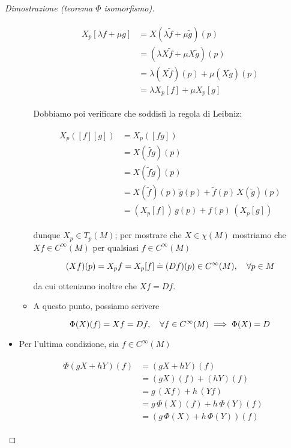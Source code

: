 \begin{proof}[Dimostrazione (teorema $ \Phi $ isomorfismo)]
\begin{itemize}
\begin{itemize}
		\begin{align}
			\begin{split}
				X_{p} [\lambda f + \mu g] &= X (\lambda \tilde{f} + \mu \tilde{g})(p)\\
				&= (\lambda X \tilde{f} + \mu X \tilde{g})(p)\\
				&= \lambda (X \tilde{f})(p) + \mu (X \tilde{g})(p)\\
				&= \lambda X_{p} [f] + \mu X_{p} [g]
			\end{split}
		\end{align}
	
		Dobbiamo poi verificare che soddisfi la regola di Leibniz:
		
		\begin{align}
			\begin{split}
				X_{p} ([f] [g]) &= X_{p} ([f g])\\
				&= X (\tilde{f g})(p)\\
				&= X (\tilde{f} \tilde{g})(p)\\
				&= X (\tilde{f})(p) \, \tilde{g}(p) + \tilde{f}(p) \, X (\tilde{g})(p)\\
				&= (X_{p} [f]) \, g(p) + f(p) \, (X_{p} [g])
			\end{split}
		\end{align}
	
		dunque $ X_{p} \in T_{p}(M) $; per mostrare che $ X \in \chi(M) $ mostriamo che $ X f \in C^{\infty}(M) $ per qualsiasi $ f \in C^{\infty}(M) $
		
		\begin{equation}
			(X f)(p) = X_{p} f %
			= X_{p} [f] %
			\doteq (D f)(p) \in C^{\infty}(M) %
			\qcomma \forall p \in M
		\end{equation}
	
		da cui otteniamo inoltre che $ X f = D f $.
		
		\item A questo punto, possiamo scrivere
		
		\begin{equation}
			\Phi(X)(f) = X f = D f \qcomma \forall f \in C^{\infty}(M) \implies \Phi(X) = D
		\end{equation}
	\end{itemize}

	
	\item Per l'ultima condizione, sia $ f \in C^{\infty}(M) $
	
	\begin{align}
		\begin{split}
			\Phi(g X + h Y)(f) &= (g X + h Y)(f) \\
			&= (g X)(f) + (h Y)(f) \\
			&= g \, (X f) + h \, (Y f) \\
			&= g \, \Phi(X)(f) + h \, \Phi(Y)(f) \\
			&= (g \, \Phi(X) + h \, \Phi(Y))(f)
		\end{split}
	\end{align}
\end{itemize}


\end{proof}
